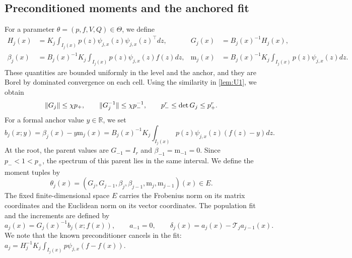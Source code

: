 \subsection*{Preconditioned moments and the anchored fit}
For a parameter $\theta=(p,f,V,Q)\in\Theta$, we define
\begin{equation}\label{eq:Udef-moments}
\begin{aligned}
 H_j(x)&=K_j\int_{I_j(x)}p(z)\psi_{j,x}(z)\psi_{j,x}(z)^\top dz,
 &G_j(x)&=B_j(x)^{-1}H_j(x),\\
 \beta_j(x)&=B_j(x)^{-1}K_j\int_{I_j(x)}p(z)\psi_{j,x}(z)f(z)dz,
 &\mathrm m_j(x)&=B_j(x)^{-1}K_j\int_{I_j(x)}p(z)\psi_{j,x}(z)dz.
\end{aligned}
\end{equation}
These quantities are bounded uniformly in the level and the anchor,
and they are Borel by dominated convergence on each cell. Using the
similarity in \cref{lem:U1}, we obtain
\begin{equation}\label{eq:U-setup-Gspec}
 \lVert G_j\rVert\le\chi p_+,\qquad
 \lVert G_j^{-1}\rVert\le\chi p_-^{-1},\qquad
 p_-^r\le\det G_j\le p_+^r.
\end{equation}
For a formal anchor value $y\in\mathbb R$, we set
\begin{equation}\label{eq:Udef-b}
 b_j(x;y)=\beta_j(x)-y\mathrm m_j(x)
 =B_j(x)^{-1}K_j\int_{I_j(x)}p(z)\psi_{j,x}(z)(f(z)-y)dz.
\end{equation}
At the root, the parent values are $G_{-1}=I_r$ and
$\beta_{-1}=\mathrm m_{-1}=0$. Since $p_-<1<p_+$, the spectrum of this
parent lies in the same interval. We define the moment tuples by
\begin{equation}\label{eq:Udef-theta}
 \theta_j(x)=(G_j,G_{j-1},\beta_j,\beta_{j-1},
                       \mathrm m_j,\mathrm m_{j-1})(x)\in E.
\end{equation}
The fixed finite-dimensional space $E$ carries the Frobenius norm on
its matrix coordinates and the Euclidean norm on its vector
coordinates. The population fit and the increments are defined by
\begin{equation}\label{eq:Udef-fit}
 a_j(x)=G_j(x)^{-1}b_j(x;f(x)),\qquad a_{-1}=0,\qquad
 \delta_j(x)=a_j(x)-\mathcal T_ja_{j-1}(x).
\end{equation}
We note that the known preconditioner cancels in the fit:
$a_j=H_j^{-1}K_j\int_{I_j(x)}p\psi_{j,x}(f-f(x))$.

